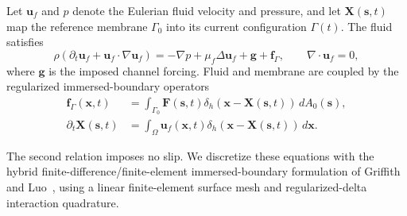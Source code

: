 \documentclass[a4paper,fleqn]{cas-sc}
\begin{document}
Let \(\bm u_f\) and \(p\) denote the Eulerian fluid velocity and pressure, and
let \(\bm X(\bm s,t)\) map the reference membrane \(\Gamma_0\) into its current
configuration \(\Gamma(t)\).  The fluid satisfies
\begin{equation}
  \rho\left(\partial_t\bm u_f+\bm u_f\!\cdot\nabla\bm u_f\right)
  =-\nabla p+\mu_f\Delta\bm u_f+\bm g+\bm f_{\Gamma},
  \qquad \nabla\!\cdot\bm u_f=0,
  \label{eq:rbc-capstone-fluid}
\end{equation}
where \(\bm g\) is the imposed channel forcing.  Fluid and membrane are coupled
by the regularized immersed-boundary operators
\begin{align}
  \bm f_{\Gamma}(\bm x,t)
  &=\int_{\Gamma_0}\bm F(\bm s,t)
   \delta_h\!\left(\bm x-\bm X(\bm s,t)\right)\,dA_0(\bm s),\label{eq:rbc-capstone-ib-coupling1}\\  
  \partial_t\bm X(\bm s,t)
  &=\int_{\Omega}\bm u_f(\bm x,t)
   \delta_h\!\left(\bm x-\bm X(\bm s,t)\right)\,d\bm x.
  \label{eq:rbc-capstone-ib-coupling2}
\end{align}

The second relation imposes no slip.  We discretize these equations with the
hybrid finite-difference/finite-element immersed-boundary formulation of
Griffith and Luo~\cite{Peskin2002IB,GriffithLuo2017HybridIB}, using a linear
finite-element surface mesh and regularized-delta interaction quadrature.
\end{document}
